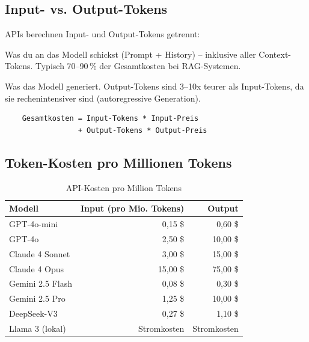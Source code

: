 \subsection{Input- vs. Output-Tokens}

APIs berechnen Input- und Output-Tokens getrennt:

\begin{description}[leftmargin=*,style=nextline]
    \item[Input-Tokens] Was du an das Modell schickst (Prompt + History)
    -- inklusive aller Context-Tokens. Typisch 70--90\,\% der Gesamtkosten
    bei RAG-Systemen.

    \item[Output-Tokens] Was das Modell generiert. Output-Tokens sind
    3--10x teurer als Input-Tokens, da sie rechenintensiver sind
    (autoregressive Generation).
\end{description}

\begin{verbatim}
    Gesamtkosten = Input-Tokens * Input-Preis
                 + Output-Tokens * Output-Preis
\end{verbatim}

\subsection{Token-Kosten pro Millionen Tokens}

\begin{table}[H]
\centering
\begin{tabularx}{\linewidth}{lrr}
\toprule
\textbf{Modell} & \textbf{Input (pro Mio. Tokens)} & \textbf{Output} \\
\midrule
GPT-4o-mini & 0,15 \$ & 0,60 \$ \\
GPT-4o & 2,50 \$ & 10,00 \$ \\
Claude 4 Sonnet & 3,00 \$ & 15,00 \$ \\
Claude 4 Opus & 15,00 \$ & 75,00 \$ \\
Gemini 2.5 Flash & 0,08 \$ & 0,30 \$ \\
Gemini 2.5 Pro & 1,25 \$ & 10,00 \$ \\
DeepSeek-V3 & 0,27 \$ & 1,10 \$ \\
Llama 3 (lokal) & Stromkosten & Stromkosten \\
\bottomrule
\end{tabularx}
\caption{API-Kosten pro Million Tokens}
\label{tab:api-kosten-kontext}
\end{table}

